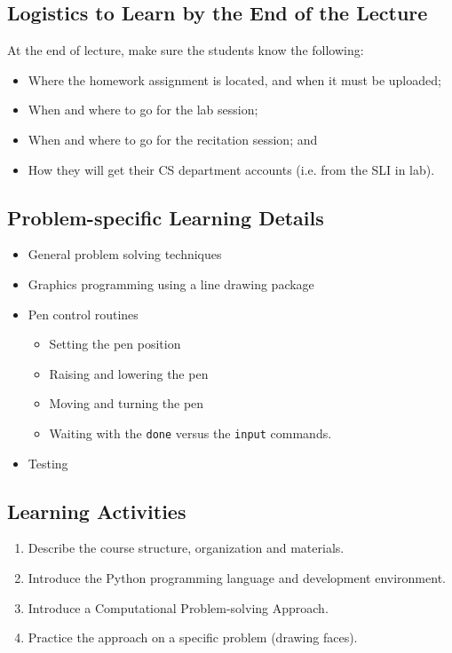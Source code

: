 \documentclass[pdftex,12pt]{artikel3}
\begin{document}
\subsection{Logistics to Learn by the End of the Lecture}

At the end of lecture, make sure the students know the following:
\begin{itemize}
\item
  Where the homework assignment is located, and when it must be uploaded;
\item
  When and where to go for the lab session;
\item
  When and where to go for the recitation session; and
\item
  How they will get their CS department accounts (i.e. from the SLI in lab).
\end{itemize}

\subsection{Problem-specific Learning Details} %

\begin{itemize}
\item
  General problem solving techniques
\item
  Graphics programming using a line drawing package
\item
  Pen control routines
    \begin{itemize}
    \item
    Setting the pen position
    \item
    Raising and lowering the pen
    \item
    Moving and turning the pen 
    \item
    Waiting with the {\tt done} versus the {\tt input} commands.
    \end{itemize}
\item
  Testing
\end{itemize}

\subsection{Learning Activities}

\begin{enumerate}
\item
  Describe the course structure, organization and materials.
\item
  Introduce the Python programming language and development environment.
\item
  Introduce a Computational Problem-solving Approach.
\item
  Practice the approach on a specific problem (drawing faces).
\end{enumerate}
\end{document}
